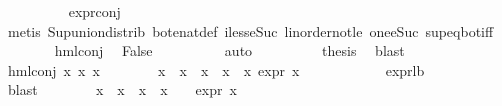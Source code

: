 \begin{isabellebody}
\ \ \ \ \ \ \ \ \isamarkupfalse%
\ expr{\isacharunderscore}{\kern0pt}{}{\isacharunderscore}{\kern0pt}conj\ \isanewline
\ \ \ \ \ \ \ \ \isamarkupfalse%
\ {\isacharparenleft}{\kern0pt}metis\ Sup{\isacharunderscore}{\kern0pt}union{\isacharunderscore}{\kern0pt}distrib\ bot{\isacharunderscore}{\kern0pt}enat{\isacharunderscore}{\kern0pt}def\ iless{\isacharunderscore}{\kern0pt}eSuc{}\ linorder{\isacharunderscore}{\kern0pt}not{\isacharunderscore}{\kern0pt}le\ one{\isacharunderscore}{\kern0pt}eSuc\ sup{\isacharunderscore}{\kern0pt}eq{\isacharunderscore}{\kern0pt}bot{\isacharunderscore}{\kern0pt}iff{\isacharparenright}{\kern0pt}\isanewline
\ \ \ \ \ \ \isamarkupfalse%
\ hml{\isacharunderscore}{\kern0pt}conj{\isacharparenleft}{\kern0pt}{}{\isacharparenright}{\kern0pt}\ \isamarkupfalse%
\ False\isanewline
\ \ \ \ \ \ \ \ \isamarkupfalse%
\ auto\isanewline
\ \ \ \ \ \ \isamarkupfalse%
\ \isamarkupfalse%
\ {\isacharquery}{\kern0pt}thesis\ \isamarkupfalse%
\ blast\isanewline
\ \ \ \ \isamarkupfalse%
\isanewline
\ \ \ \ \ \ \isamarkupfalse%
\ {\isacharparenleft}{\kern0pt}hml{\isacharunderscore}{\kern0pt}conj\ x{}{}\ x{}{}\ x{}{}{\isacharparenright}{\kern0pt}\isanewline
\ \ \ \ \ \ \isamarkupfalse%
\ {\isachardoublequoteopen}{\isasymforall}x\ {\isasymin}\ {\isacharparenleft}{\kern0pt}x{}{}\ {\isacharbackquote}{\kern0pt}\ x{}{}\ {\isasymunion}\ x{}{}\ {\isacharbackquote}{\kern0pt}\ x{}{}{\isacharparenright}{\kern0pt}{\isachardot}{\kern0pt}\ expr{\isacharunderscore}{\kern0pt}{}\ x\ {\isasymge}\ {}{\isachardoublequoteclose}\isanewline
\ \ \ \ \ \ \ \ \isamarkupfalse%
\ expr{\isacharunderscore}{\kern0pt}{}{\isacharunderscore}{\kern0pt}lb\isanewline
\ \ \ \ \ \ \ \ \isamarkupfalse%
\ blast\isanewline
\ \ \ \ \ \ \isamarkupfalse%
\ {\isachardoublequoteopen}{\isacharparenleft}{\kern0pt}x{}{}\ {\isacharbackquote}{\kern0pt}\ x{}{}\ {\isasymunion}\ x{}{}\ {\isacharbackquote}{\kern0pt}\ x{}{}{\isacharparenright}{\kern0pt}\ {\isasymnoteq}\ {\isacharbraceleft}{\kern0pt}{\isacharbraceright}{\kern0pt}\ {\isasymlongrightarrow}\ expr{\isacharunderscore}{\kern0pt}{}\ x\ {\isasymge}\ {}{\isachardoublequoteclose}\isanewline

\end{isabellebody}
